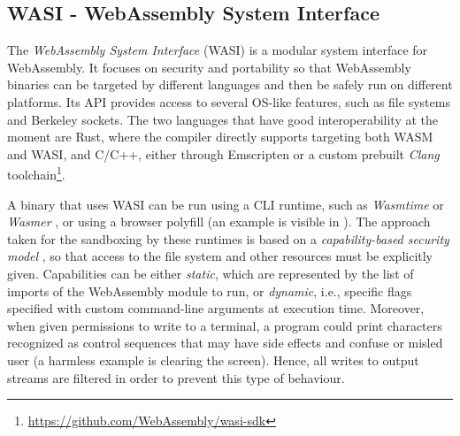 \subsection{WASI - WebAssembly System Interface}
\label{sec:introduction-wasi}

The \textit{WebAssembly System Interface} (WASI) \cite{wasi} is a modular system interface for WebAssembly.
It focuses on security and portability so that WebAssembly binaries can be targeted by different languages
and then be safely run on different platforms.
Its API provides access to several OS-like features, such as file systems and Berkeley sockets.
The two languages that have good interoperability at the moment are Rust, where the compiler directly supports targeting both WASM and WASI,
and C/C++, either through Emscripten or a custom prebuilt \textit{Clang} toolchain\footnote{\url{https://github.com/WebAssembly/wasi-sdk}}.

A binary that uses WASI can be run using a CLI runtime, such as \textit{Wasmtime} \cite{wasmtime} or \textit{Wasmer} \cite{wasmer},
or using a browser polyfill (an example is visible in \cite{wasi-polyfill}).
The approach taken for the sandboxing by these runtimes is based on a \textit{capability-based security model} \cite{wasmtime-security-sandboxing},
so that access to the file system and other resources must be explicitly given. Capabilities can be either \textit{static}, which
are represented by the list of imports of the WebAssembly module to run, or \textit{dynamic}, i.e., specific flags
specified with custom command-line arguments at execution time.
Moreover, when given permissions to write to a terminal, a program could print characters recognized as control
sequences that may have side effects and confuse or misled user (a harmless example is clearing the screen).
Hence, all writes to output streams are filtered in order to prevent this type of behaviour.

